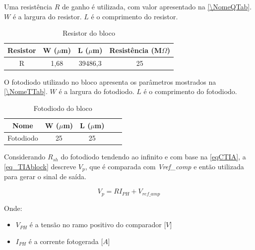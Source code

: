 Uma resist\^encia $R$ de ganho \'e utilizada, com valor apresentado na \autoref{\NomeQTab}. $W$ é a largura do resistor. $L$ é o comprimento do resistor.

\begin{table}[!h]
\caption{Resistor do bloco \NomeBloco}
\label{\NomeQTab}
\centering
\begin{tabular}{cccc}
\toprule
Resistor & W ($\mu$m)  & L ($\mu$m) & Resist\^encia (M$\Omega$)\\
\midrule \midrule
R & 1,68 & 39486,3 & 25\\
\bottomrule
\end{tabular}
\end{table}

O fotodiodo utilizado no bloco apresenta os par\^ametros mostrados na \autoref{\NomeTTab}. $W$ é a largura do fotodiodo. $L$ é o comprimento do fotodiodo.

\begin{table}[!h]
\caption{Fotodiodo do bloco \NomeBloco}
\label{\NomeTTab}
\centering
\begin{tabular}{ccccc}
\toprule
Nome & W ($\mu$m)  & L ($\mu$m)\\
\midrule \midrule
Fotodiodo & 25 & 25\\
\bottomrule
\end{tabular}
\end{table}

Considerando $R_{sh}$ do fotodiodo tendendo ao infinito e com base na \autoref{eqCTIA}, a \autoref{eq_TIAblock} descreve $V_{p}$, que \'e comparada com \textit{Vref\_comp} e então utilizada para gerar o sinal de sa\'ida.

\begin{equation}
    \label{eq_TIAblock}
    V_{p} = RI_{PH} + V_{ref\_amp}
\end{equation}

Onde:

\begin{itemize}

    \item \textit{$V_{PH}$} \'e a tensão no ramo positivo do comparador [$V$]
    \item \textit{$I_{PH}$} \'e a corrente fotogerada [$A$]
    
\end{itemize}